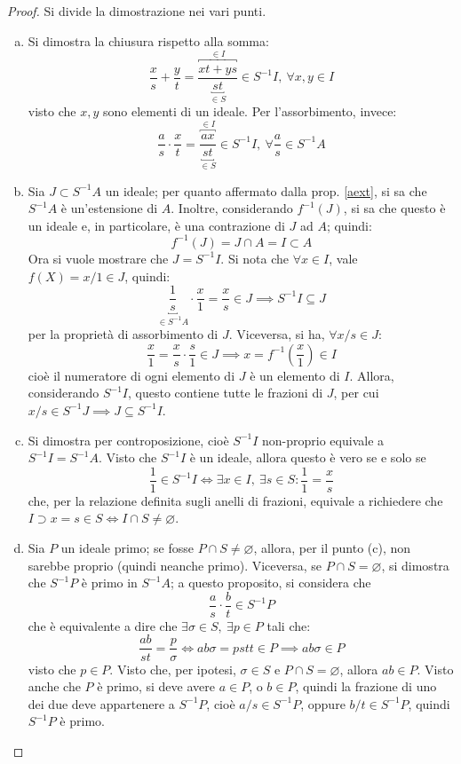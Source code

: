 \documentclass[12pt]{scrartcl}
\theoremstyle{style}
\numberwithin{equation}{subsection}
\begin{document}
	\begin{proof}
		Si divide la dimostrazione nei vari punti.
		\begin{enumerate}[(a).]
			\item Si dimostra la chiusura rispetto alla somma:
				\[
					\frac{x}{s} + \frac{y}{t} = \frac{\overbracket{xt + ys}^{\in I} }{\underbracket{st}_{\in S} }\in S^{-1}I, \ \forall x,y \in I
				\] 
				visto che $x,y$ sono elementi di un ideale.
				Per l'assorbimento, invece:
\[
	\frac{a}{s}\cdot \frac{x}{t} = \frac{\overbracket{ax}^{\in I} }{\underbracket{st}_{\in S} } \in S^{-1}I , \ \forall \frac{a}{s}\in S^{-1}A
\] 
\item Sia $J \subset S^{-1}A$ un ideale; per quanto affermato dalla prop. \ref{aext}, si sa che $S^{-1}A$ \`e un'estensione di $A$.
	Inoltre, considerando $f^{-1}(J)$, si sa che questo \`e un ideale e, in particolare, \`e una contrazione di $J$ ad $A$; quindi:
	\[
	f^{-1}(J) = J\cap A = I \subset A
	\] 
	Ora si vuole mostrare che $J = S^{-1}I$.
	Si nota che $\forall x \in I$, vale $f(X) = x / 1 \in J$, quindi:
	\[
		\underbracket{\frac{1}{s} }_{\in S^{-1}A} \cdot \frac{x}{1}= \frac{x}{s} \in J\implies S^{-1}I \subseteq J
	\] 
	per la propriet\`a di assorbimento di $J$.
	Viceversa, si ha, $\forall x / s \in J$:
	\[
	\frac{x}{1} = \frac{x}{s} \cdot \frac{s}{1} \in J\implies x = f^{-1}\left(\frac{x}{1}\right) \in I
	\] 
	cio\`e il numeratore di ogni elemento di $J$ \`e un elemento di $I$.
	Allora, considerando $S^{-1}I$, questo contiene tutte le frazioni di $J$, per cui $x /s \in S^{-1}J \implies J \subseteq S^{-1}I$.
\item Si dimostra per controposizione, cio\`e $S^{-1}I$ non-proprio equivale a $S^{-1}I = S^{-1}A$.
	Visto che $S^{-1}I$ \`e un ideale, allora questo \`e vero se e solo se 
	\[
	\frac{1}{1} \in S^{-1}I \iff \exists x \in I, \ \exists s \in S : \frac{1}{1} = \frac{x}{s}
	\] 
	che, per la relazione definita sugli anelli di frazioni, equivale a richiedere che $I \supset x = s \in S \iff I \cap S \neq \varnothing$.
\item Sia $P$ un ideale primo; se fosse $P\cap S \neq \varnothing$, allora, per il punto (c), non sarebbe proprio (quindi neanche primo).
	Viceversa, se $P \cap S = \varnothing$, si dimostra che $S^{-1}P$ \`e primo in $S^{-1}A$; a questo proposito, si considera che
\[
\frac{a}{s}\cdot \frac{b}{t} \in S^{-1}P
\] 
che \`e equivalente a dire che $\exists \sigma \in S, \ \exists p \in P$ tali che:
\[
\frac{ab}{st} = \frac{p}{\sigma } \iff ab\sigma = p st t\in P \implies ab \sigma  \in P
\] 
visto che $p \in P$.
Visto che, per ipotesi, $\sigma \in S$ e $P\cap S = \varnothing$, allora $ab \in P$.
Visto anche che $P$ \`e primo, si deve avere $a \in P$, o $b \in P$, quindi la frazione di uno dei due deve appartenere a $S^{-1}P$, cio\`e $a / s \in S^{-1}P$, oppure $b / t \in S^{-1}P$, quindi $S^{-1}P$ \`e primo.
		\end{enumerate}
	\end{proof}
\end{document}

